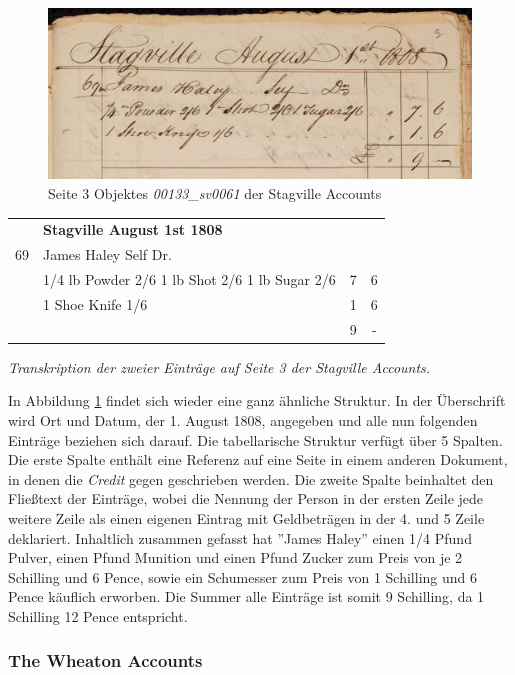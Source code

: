 \documentclass[12pt,a4paper]{article}
\begin{document}
\begin{figure}[H]
  \centering
  \includegraphics[width=1\textwidth]{img/stagville.jpg}  
  \caption[Seite 3 des Objektes \textit{00133\_sv0061} der Stagville Accounts, \protect\url{fromthepage.com/agbedavies/stagville-accounts/00133-sv0061/display/7884}]{Seite 3 Objektes \textit{00133\_sv0061} der Stagville Accounts} \label{fig:stagville}
\end{figure}
\begin{tabular}{clcc}
  & \textbf{Stagville August 1st 1808}\\
 69 & James Haley Self Dr. & &\\
    & 1/4 lb Powder 2/6 1 lb Shot 2/6 1 lb Sugar 2/6 & 7 & 6\\
	& 1 Shoe Knife 1/6  & 1 & 6\\
	& & 9  & -
\end{tabular}
\medskip
\begin{center}
\textit{Transkription der zweier Einträge auf Seite 3 der Stagville Accounts.}
\end{center}
In Abbildung \ref{fig:stagville} findet sich wieder eine ganz ähnliche Struktur. In der Überschrift wird Ort und Datum, der 1. August 1808, angegeben und alle nun folgenden Einträge beziehen sich darauf. Die tabellarische Struktur verfügt über 5 Spalten. Die erste Spalte enthält eine Referenz auf eine Seite in einem anderen Dokument, in denen die \textit{Credit} gegen geschrieben werden. Die zweite Spalte beinhaltet den Fließtext der Einträge, wobei die Nennung der Person in der ersten Zeile jede weitere Zeile als einen eigenen Eintrag mit Geldbeträgen in der 4. und 5 Zeile deklariert. Inhaltlich zusammen gefasst hat ''James Haley'' einen 1/4 Pfund Pulver, einen Pfund Munition und einen Pfund Zucker zum Preis von je 2 Schilling und 6 Pence, sowie ein Schumesser zum Preis von 1 Schilling und 6 Pence käuflich erworben. Die Summer alle Einträge ist somit 9 Schilling, da 1 Schilling 12 Pence entspricht.

\subsubsection{The Wheaton Accounts}
\end{document}
